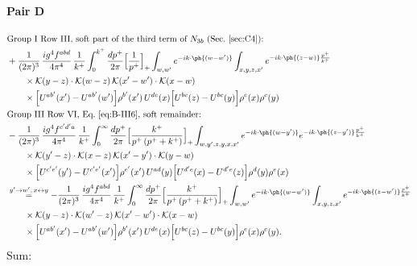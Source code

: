 \paragraph{Pair D}
\begingroup\color{pD}
\begin{align}
&\text{Group I Row III, soft part of the third term of $N_{3b}$ (Sec.~\ref{sec:C4}):}\notag\\
&+\frac{1}{(2\pi)^{3}}\,\frac{ig^{4}f^{abd}}{4\pi^{4}}\,\frac{1}{k^{+}}\int_{0}^{k^{+}}\frac{dp^{+}}{2\pi}\Big[\frac{1}{p^{+}}\Big]_{+}\int_{w,w'}e^{-ik\cdot\ph{(w-w')}}\int_{x,y,z,x'}e^{-ik\cdot\ph{(z-w)}\frac{p^{+}}{k^{+}}}\notag\\
&\qquad\times\mathcal{K}(y-z)\cdot\mathcal{K}(w-z)\,\mathcal{K}(x'-w')\cdot\mathcal{K}(x-w)\notag\\
&\qquad\times\Big[U^{ab'}(x')-U^{ab'}(w')\Big]\rho^{b'}(x')\,U^{de}(x)\Big[U^{bc}(z)-U^{bc}(y)\Big]\rho^{e}(x)\rho^{c}(y)\notag\\
&\text{Group III Row VI, Eq.~\eqref{eq:B-III6}, soft remainder:}\notag\\
&-\frac{1}{(2\pi)^{3}}\,\frac{ig^{4}f^{c'd'a}}{4\pi^{4}}\,\frac{1}{k^{+}}\int_{0}^{\infty}\frac{dp^{+}}{2\pi}\Big[\frac{k^{+}}{p^{+}\,(p^{+}+k^{+})}\Big]_{+}\int_{w,y',z,y,x,x'}e^{-ik\cdot\ph{(w-y')}}e^{-ik\cdot\ph{(z-y')}\frac{p^{+}}{k^{+}}}\notag\\
&\qquad\times\mathcal{K}(y'-z)\cdot\mathcal{K}(x-z)\,\mathcal{K}(x'-y')\cdot\mathcal{K}(y-w)\notag\\
&\qquad\times\Big[U^{c'e'}(y')-U^{c'e'}(x')\Big]\rho^{e'}(x')\,U^{ad}(y)\Big[U^{d'e}(x)-U^{d'e}(z)\Big]\rho^{d}(y)\rho^{e}(x)\notag\\
&\overset{y'\to w',\,x\leftrightarrow y}{=}-\frac{1}{(2\pi)^{3}}\,\frac{ig^{4}f^{abd}}{4\pi^{4}}\,\frac{1}{k^{+}}\int_{0}^{\infty}\frac{dp^{+}}{2\pi}\Big[\frac{k^{+}}{p^{+}\,(p^{+}+k^{+})}\Big]_{+}\int_{w,w'}e^{-ik\cdot\ph{(w-w')}}\int_{x,y,z,x'}e^{-ik\cdot\ph{(z-w')}\frac{p^{+}}{k^{+}}}\notag\\
&\qquad\times\mathcal{K}(y-z)\cdot\mathcal{K}(w'-z)\,\mathcal{K}(x'-w')\cdot\mathcal{K}(x-w)\notag\\
&\qquad\times\Big[U^{ab'}(x')-U^{ab'}(w')\Big]\rho^{b'}(x')\,U^{de}(x)\Big[U^{bc}(z)-U^{bc}(y)\Big]\rho^{e}(x)\rho^{c}(y).\notag
\end{align}
\endgroup
Sum:
